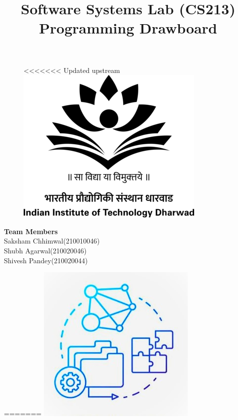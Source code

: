 \documentclass[letterpaper,10pt]{article}
\date{}
\begin{document}
    \title{\begin{LARGE}
	Software Systems Lab (CS213)\\  \textbf{Programming Drawboard}    
    \end{LARGE}}
    \maketitle
    \begin{figure}[t!]
    \begin{center}
    	
<<<<<<< Updated upstream
    \includegraphics[scale=1]{logo.png}
    
    \end{center}
    \end{figure}
    \begin{flushright}
    \begin{large}
    
    \textbf{Team Members\\}
     Saksham Chhimwal(210010046)\\
     Shubh Agarwal(210020046)\\
     Shivesh Pandey(210020044)\\
    \end{large}
    \end{flushright}
=======
    \includegraphics[scale=0.8]{logo.jpg}
    
\end{document}
